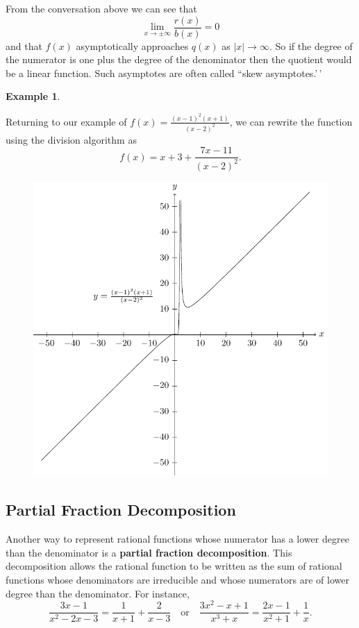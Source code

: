 \documentclass[
]{book}
\theoremstyle{definition}
\theoremstyle{definition}
\newtheorem{example}{Example}[chapter]
\theoremstyle{definition}
\theoremstyle{definition}
\theoremstyle{remark}
\begin{document}
From the conversation above we can see that \[\lim_{x\rightarrow \pm \infty} \frac{r(x)}{b(x)} =0\] and that \(f(x)\) asymptotically approaches \(q(x)\) as \(|x| \rightarrow \infty\). So if the degree of the numerator is one plus the degree of the denominator then the quotient would be a linear function. Such asymptotes are often called ``skew asymptotes.'\,'

\begin{example}
\protect\hypertarget{exm:unlabeled-div-136}{}\label{exm:unlabeled-div-136}

Returning to our example of \(f(x)=\frac{(x-1)^2(x+1)}{(x-2)^2}\), we can rewrite the function using the division algorithm as
\[f(x)= x+3 + \frac{7x-11}{(x-2)^2}.\]

\begin{figure}

{\centering \includegraphics[width=0.5\linewidth]{tikz/rational5} 

}

\end{figure}

\end{example}

\hypertarget{partial-fraction-decomposition}{%
\subsection{Partial Fraction Decomposition}\label{partial-fraction-decomposition}}

Another way to represent rational functions whose numerator has a lower degree than the denominator is a \textbf{partial fraction decomposition}. This decomposition allows the rational function to be written as the sum of rational functions whose denominators are irreducible and whose numerators are of lower degree than the denominator. For instance,
\[\frac{3x-1}{x^2-2x-3} = \frac{1}{x+1} + \frac{2}{x-3}\quad \mbox{or} \quad \frac{3x^2-x+1}{x^3+x} = \frac{2x-1}{x^2+1} + \frac{1}{x}.\]
\end{document}
